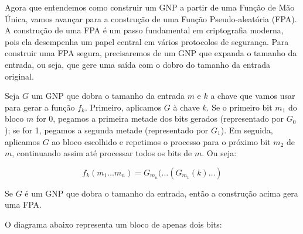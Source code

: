 Agora que entendemos como construir um GNP a partir de uma Função de Mão Única, vamos avançar para a construção de uma Função Pseudo-aleatória (FPA).
A construção de uma FPA é um passo fundamental em criptografia moderna, pois ela desempenha um papel central em vários protocolos de segurança.
Para construir uma FPA segura, precisaremos de um GNP que expanda o tamanho da entrada, ou seja, que gere uma saída com o dobro do tamanho da entrada original. 

Seja $G$ um GNP que dobra o tamanho da entrada $m$ e $k$ a chave que vamos usar para gerar a função $f_k$.
Primeiro, aplicamos $G$ à chave $k$.
Se o primeiro bit $m_1$ do bloco $m$ for 0, pegamos a primeira metade dos bits gerados (representado por $G_0$); se for 1, pegamos a segunda metade (representado por $G_1$).
Em seguida, aplicamos $G$ ao bloco escolhido e repetimos o processo para o próximo bit $m_2$ de $m$, continuando assim até processar todos os bits de $m$.
Ou seja:

\begin{displaymath}
f_k(m_1 \dots m_n) = G_{m_n}(\dots(G_{m_1}(k) \dots )
\end{displaymath}

\begin{theorem}[Yao]
  Se $G$ é um GNP que dobra o tamanho da entrada, então a construção acima gera uma FPA.
\end{theorem}

O diagrama abaixo representa um bloco de apenas dois bits:


